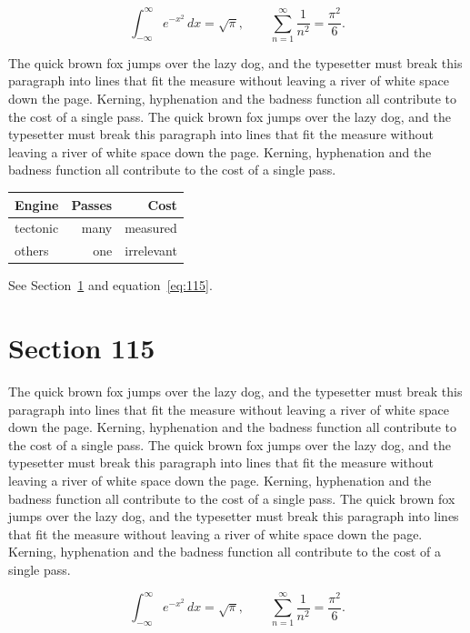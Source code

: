 \documentclass{article}
\begin{document}
\begin{equation}\label{eq:114}
\int_{-\infty}^{\infty} e^{-x^{2}}\,dx = \sqrt{\pi}, \qquad
\sum_{n=1}^{\infty} \frac{1}{n^{2}} = \frac{\pi^{2}}{6}.
\end{equation}

The quick brown fox jumps over the lazy dog, and the typesetter must break this paragraph into lines that fit the measure without leaving a river of white space down the page. Kerning, hyphenation and the badness function all contribute to the cost of a single pass. The quick brown fox jumps over the lazy dog, and the typesetter must break this paragraph into lines that fit the measure without leaving a river of white space down the page. Kerning, hyphenation and the badness function all contribute to the cost of a single pass. 

\begin{center}
\begin{tabular}{lrr}
\toprule
Engine & Passes & Cost \\
\midrule
tectonic & many & measured \\
others & one & irrelevant \\
\bottomrule
\end{tabular}
\end{center}

See Section~\ref{sec:115} and equation~\eqref{eq:115}.
\section{Section 115}
\label{sec:115}
The quick brown fox jumps over the lazy dog, and the typesetter must break this paragraph into lines that fit the measure without leaving a river of white space down the page. Kerning, hyphenation and the badness function all contribute to the cost of a single pass. The quick brown fox jumps over the lazy dog, and the typesetter must break this paragraph into lines that fit the measure without leaving a river of white space down the page. Kerning, hyphenation and the badness function all contribute to the cost of a single pass. The quick brown fox jumps over the lazy dog, and the typesetter must break this paragraph into lines that fit the measure without leaving a river of white space down the page. Kerning, hyphenation and the badness function all contribute to the cost of a single pass. 

\begin{equation}\label{eq:115}
\int_{-\infty}^{\infty} e^{-x^{2}}\,dx = \sqrt{\pi}, \qquad
\sum_{n=1}^{\infty} \frac{1}{n^{2}} = \frac{\pi^{2}}{6}.
\end{equation}
\end{document}
